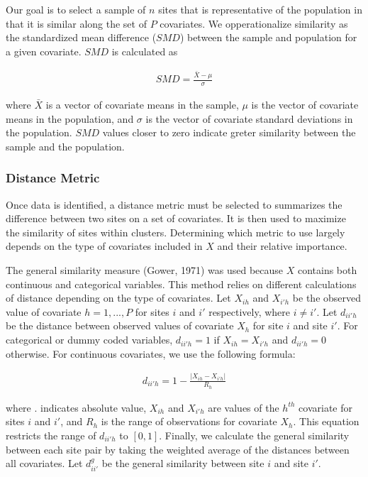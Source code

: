 \documentclass[man,floatsintext]{apa6}
\begin{document}
Our goal is to select a sample of \(n\) sites that is representative of the population in that it is similar along the set of \(P\) covariates. We opperationalize similarity as the standardized mean difference (\(SMD\)) between the sample and population for a given covariate. \(SMD\) is calculated as

\begin{align}
  SMD = \frac{\bar{X}-\mu}{\sigma}
\end{align}

where \(\bar{X}\) is a vector of covariate means in the sample, \(\mu\) is the vector of covariate means in the population, and \(\sigma\) is the vector of covariate standard deviations in the population. \(SMD\) values closer to zero indicate greter similarity between the sample and the population.

\hypertarget{distance-metric}{%
\subsubsection{Distance Metric}\label{distance-metric}}

Once data is identified, a distance metric must be selected to summarizes the difference between two sites on a set of covariates. It is then used to maximize the similarity of sites within clusters. Determining which metric to use largely depends on the type of covariates included in \(X\) and their relative importance.

The general similarity measure (Gower, 1971) was used because \(X\) contains both continuous and categorical variables. This method relies on different calculations of distance depending on the type of covariates. Let \(X_{ih}\) and \(X_{i'h}\) be the observed value of covariate \(h = {1, ..., P}\) for sites \(i\) and \(i'\) respectively, where \(i \ne i'\). Let \(d_{ii'h}\) be the distance between observed values of covariate \(X_{h}\) for site \(i\) and site \(i'\). For categorical or dummy coded variables, \(d_{ii'h} = 1\) if \(X_{ih} = X_{i'h}\) and \(d_{ii'h} = 0\) otherwise. For continuous covariates, we use the following formula:

\begin{align}
  d_{ii'h} = 1 - \frac{|X_{ih} - X_{i'h}|}{R_h}
\end{align}

where \textbar{}.\textbar{} indicates absolute value, \(X_{ih}\) and \(X_{i'h}\) are values of the \(h^{th}\) covariate for sites \(i\) and \(i'\), and \(R_h\) is the range of observations for covariate \(X_h\). This equation restricts the range of \(d_{ii'h}\) to \([0,1]\). Finally, we calculate the general similarity between each site pair by taking the weighted average of the distances between all covariates. Let \(d^{g}_{ii'}\) be the general similarity between site \(i\) and site \(i'\).
\end{document}
